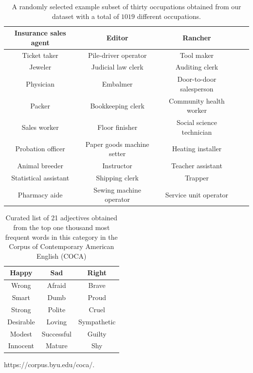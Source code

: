 \documentclass[twoside,11pt]{article}
\begin{document}
\begin{table}[H]
\centering
\small{
	\begin{tabular}{|c|c|c|c|c|}
	\hline
	Insurance sales agent 	& Editor 						& Rancher 					\\ \hline
	Ticket taker 			& Pile-driver operator 			& Tool maker 				\\ \hline
	Jeweler 				& Judicial law clerk 			& Auditing clerk 			\\ \hline
	Physician 				& Embalmer 						& Door-to-door salesperson 	\\ \hline
	Packer 					& Bookkeeping clerk 			& Community health worker 	\\ \hline
	Sales worker 			& Floor finisher 				& Social science technician \\ \hline
	Probation officer 		& Paper goods machine setter 	& Heating installer 		\\ \hline
	Animal breeder 			& Instructor 					& Teacher assistant 		\\ \hline
	Statistical assistant 	& Shipping clerk 				& Trapper 					\\ \hline
	Pharmacy aide 			& Sewing machine operator 		& Service unit operator 	\\ \hline
	\end{tabular}
	}
    \caption{A randomly selected example subset of thirty occupations obtained from our dataset with a total of $1019$ different occupations.}
	\label{tab:occupations-examples}
\end{table}

\begin{table}[H]
\centering
\small{
	\begin{tabular}{|c|c|c|}
	\hline
	Happy 		& Sad 		 & Right 		\\ \hline
	Wrong 		& Afraid	 & Brave 		\\ \hline
	Smart		& Dumb		 & Proud 		\\ \hline
	Strong		& Polite	 & Cruel 		\\ \hline
	Desirable	& Loving	 & Sympathetic 	\\ \hline
	Modest 		& Successful & Guilty		\\ \hline
	Innocent	& Mature	 & Shy			\\ \hline
	\end{tabular}
	}
    \caption{Curated list of 21 adjectives obtained from the top one thousand most frequent words in this category in the Corpus of Contemporary American English (COCA)} https://corpus.byu.edu/coca/.
	\label{tab:adjectives}
\end{table}
\end{document}
